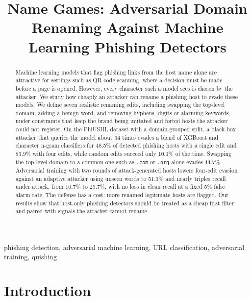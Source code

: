 \documentclass[conference]{IEEEtran}
\begin{document}
\title{Name Games: Adversarial Domain Renaming Against Machine Learning Phishing Detectors}

\author{
}

\maketitle

\begin{abstract}
Machine learning models that flag phishing links from the host name alone are attractive for settings such as QR code scanning, where a decision must be made before a page is opened. However, every character such a model sees is chosen by the attacker. We study how cheaply an attacker can rename a phishing host to evade these models. We define seven realistic renaming edits, including swapping the top-level domain, adding a benign word, and removing hyphens, digits or alarming keywords, under constraints that keep the brand being imitated and forbid hosts the attacker could not register. On the PhiUSIIL dataset with a domain-grouped split, a black-box attacker that queries the model about 34 times evades a blend of XGBoost and character n-gram classifiers for 48.5\% of detected phishing hosts with a single edit and 83.9\% with four edits, while random edits succeed only 10.1\% of the time. Swapping the top-level domain to a common one such as \texttt{.com} or \texttt{.org} alone evades 44.7\%. Adversarial training with two rounds of attack-generated hosts lowers four-edit evasion against an adaptive attacker using unseen words to 51.3\% and nearly triples recall under attack, from 10.7\% to 29.7\%, with no loss in clean recall at a fixed 5\% false alarm rate. The defense has a cost: more renamed legitimate hosts are flagged. Our results show that host-only phishing detectors should be treated as a cheap first filter and paired with signals the attacker cannot rename.
\end{abstract}

\begin{IEEEkeywords}
phishing detection, adversarial machine learning, URL classification, adversarial training, quishing
\end{IEEEkeywords}

\section{Introduction}
\end{document}
